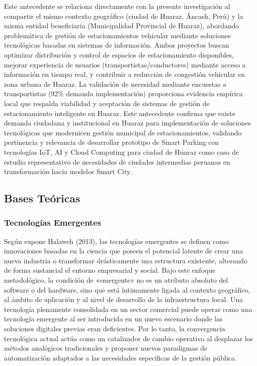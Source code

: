 \documentclass[12pt,a4paper]{article}
\begin{document}
Este antecedente se relaciona directamente con la presente investigación al compartir el mismo contexto geográfico (ciudad de Huaraz, Áncash, Perú) y la misma entidad beneficiaria (Municipalidad Provincial de Huaraz), abordando problemática de gestión de estacionamientos vehicular mediante soluciones tecnológicas basadas en sistemas de información. Ambos proyectos buscan optimizar distribución y control de espacios de estacionamiento disponibles, mejorar experiencia de usuarios (transportistas/conductores) mediante acceso a información en tiempo real, y contribuir a reducción de congestión vehicular en zona urbana de Huaraz. La validación de necesidad mediante encuestas a transportistas (92\% demanda implementación) proporciona evidencia empírica local que respalda viabilidad y aceptación de sistemas de gestión de estacionamiento inteligente en Huaraz. Este antecedente confirma que existe demanda ciudadana y institucional en Huaraz para implementación de soluciones tecnológicas que modernicen gestión municipal de estacionamientos, validando pertinencia y relevancia de desarrollar prototipo de Smart Parking con tecnologías IoT, AI y Cloud Computing para ciudad de Huaraz como caso de estudio representativo de necesidades de ciudades intermedias peruanas en transformación hacia modelos Smart City.

\subsection{Bases Teóricas}

\subsubsection{Tecnologías Emergentes}

Según expone Halaweh (2013), las tecnologías emergentes se definen como innovaciones basadas en la ciencia que poseen el potencial latente de crear una nueva industria o transformar drásticamente una estructura existente, alterando de forma sustancial el entorno empresarial y social. Bajo este enfoque metodológico, la condición de «emergente» no es un atributo absoluto del software o del hardware, sino que está íntimamente ligada al contexto geográfico, al ámbito de aplicación y al nivel de desarrollo de la infraestructura local. Una tecnología plenamente consolidada en un sector comercial puede operar como una tecnología emergente al ser introducida en un nuevo escenario donde las soluciones digitales previas eran deficientes. Por lo tanto, la convergencia tecnológica actual actúa como un catalizador de cambio operativo al desplazar los métodos analógicos tradicionales y proponer nuevos paradigmas de automatización adaptados a las necesidades específicas de la gestión pública.
\end{document}
